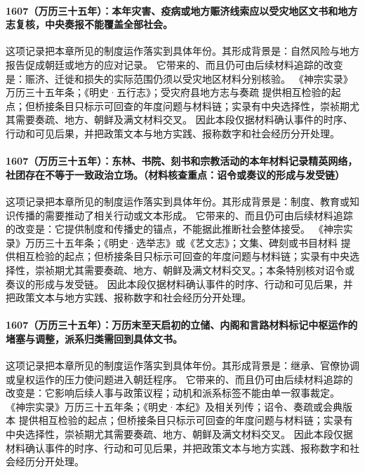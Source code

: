 \paragraph{1607（万历三十五年）：本年灾害、疫病或地方赈济线索应以受灾地区文书和地方志复核，中央奏报不能覆盖全部社会。} 这项记录把本章所见的制度运作落实到具体年份。其形成背景是：自然风险与地方报告促成朝廷或地方的应对记录。 它带来的、而且仍可由后续材料追踪的改变是：赈济、迁徙和损失的实际范围仍须以受灾地区材料分别核验。 《神宗实录》万历三十五年条；《明史·五行志》；受灾府县地方志与奏疏 提供相互检验的起点；但桥接条目只标示可回查的年度问题与材料链；实录有中央选择性，崇祯期尤其需要奏疏、地方、朝鲜及满文材料交叉。 因此本段仅据材料确认事件的时序、行动和可见后果，并把政策文本与地方实践、报称数字和社会经历分开处理。

\paragraph{1607（万历三十五年）：东林、书院、刻书和宗教活动的本年材料记录精英网络，社团存在不等于一致政治立场。（材料核查重点：诏令或奏议的形成与发受链）} 这项记录把本章所见的制度运作落实到具体年份。其形成背景是：制度、教育或知识传播的需要推动了相关行动或文本形成。 它带来的、而且仍可由后续材料追踪的改变是：它提供制度和传播史的锚点，不能据此推断社会整体接受。 《神宗实录》万历三十五年条；《明史·选举志》或《艺文志》；文集、碑刻或书目材料 提供相互检验的起点；但桥接条目只标示可回查的年度问题与材料链；实录有中央选择性，崇祯期尤其需要奏疏、地方、朝鲜及满文材料交叉。；本条特别核对诏令或奏议的形成与发受链。 因此本段仅据材料确认事件的时序、行动和可见后果，并把政策文本与地方实践、报称数字和社会经历分开处理。

\paragraph{1607（万历三十五年）：万历末至天启初的立储、内阁和言路材料标记中枢运作的堵塞与调整，派系归类需回到具体文书。} 这项记录把本章所见的制度运作落实到具体年份。其形成背景是：继承、官僚协调或皇权运作的压力使问题进入朝廷程序。 它带来的、而且仍可由后续材料追踪的改变是：它影响后续人事与政策议程；动机和派系标签不能由单一叙事裁定。 《神宗实录》万历三十五年条；《明史·本纪》及相关列传；诏令、奏疏或会典版本 提供相互检验的起点；但桥接条目只标示可回查的年度问题与材料链；实录有中央选择性，崇祯期尤其需要奏疏、地方、朝鲜及满文材料交叉。 因此本段仅据材料确认事件的时序、行动和可见后果，并把政策文本与地方实践、报称数字和社会经历分开处理。

